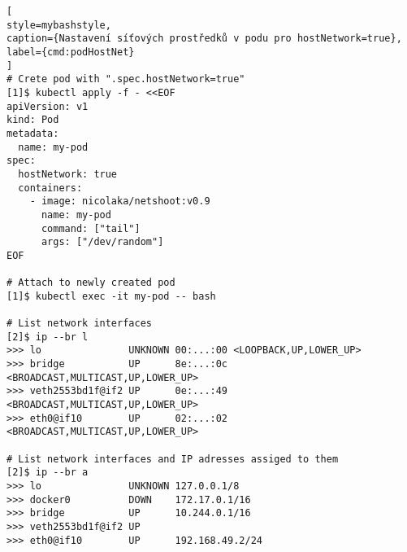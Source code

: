 \begin{lstfloat}
\begin{lstlisting}[
style=mybashstyle,
caption={Nastavení síťových prostředků v podu pro hostNetwork=true},
label={cmd:podHostNet}
]
# Crete pod with ".spec.hostNetwork=true"
[1]$ kubectl apply -f - <<EOF
apiVersion: v1
kind: Pod
metadata:
  name: my-pod
spec:
  hostNetwork: true
  containers:
    - image: nicolaka/netshoot:v0.9
      name: my-pod
      command: ["tail"]
      args: ["/dev/random"]
EOF

# Attach to newly created pod
[1]$ kubectl exec -it my-pod -- bash

# List network interfaces
[2]$ ip --br l
>>> lo               UNKNOWN 00:...:00 <LOOPBACK,UP,LOWER_UP> 
>>> bridge           UP      8e:...:0c <BROADCAST,MULTICAST,UP,LOWER_UP> 
>>> veth2553bd1f@if2 UP      0e:...:49 <BROADCAST,MULTICAST,UP,LOWER_UP> 
>>> eth0@if10        UP      02:...:02 <BROADCAST,MULTICAST,UP,LOWER_UP>

# List network interfaces and IP adresses assiged to them
[2]$ ip --br a
>>> lo               UNKNOWN 127.0.0.1/8 
>>> docker0          DOWN    172.17.0.1/16 
>>> bridge           UP      10.244.0.1/16 
>>> veth2553bd1f@if2 UP
>>> eth0@if10        UP      192.168.49.2/24
\end{lstlisting}
\end{lstfloat}